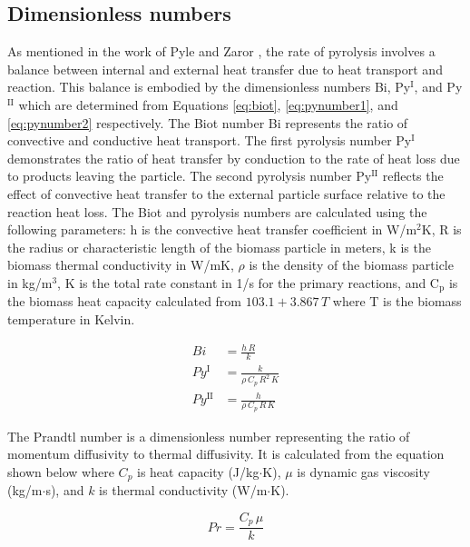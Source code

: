 
\subsection{Dimensionless numbers}

As mentioned in the work of Pyle and Zaror \cite{Pyle-1984}, the rate of pyrolysis involves a balance between internal and external heat transfer due to heat transport and reaction. This balance is embodied by the dimensionless numbers Bi, Py$^\textrm{I}$, and Py$^\textrm{II}$ which are determined from Equations \ref{eq:biot}, \ref{eq:pynumber1}, and \ref{eq:pynumber2} respectively. The Biot number Bi represents the ratio of convective and conductive heat transport. The first pyrolysis number Py$^\textrm{I}$ demonstrates the ratio of heat transfer by conduction to the rate of heat loss due to products leaving the particle. The second pyrolysis number Py$^\textrm{II}$ reflects the effect of convective heat transfer to the external particle surface relative to the reaction heat loss. The Biot and pyrolysis numbers are calculated using the following parameters: h is the convective heat transfer coefficient in W/m$^2$K, R is the radius or characteristic length of the biomass particle in meters, k is the biomass thermal conductivity in W/mK, $\rho$ is the density of the biomass particle in kg/m$^3$, K is the total rate constant in 1/s for the primary reactions, and C$_\textrm{p}$ is the biomass heat capacity calculated from $103.1 + 3.867\,T$ where T is the biomass temperature in Kelvin.

\begin{align}
    Bi &= \frac{h\,R}{k} \label{eq:biot} \\
    Py^{\textrm{I}} &= \frac{k}{\rho\,C_p\,R^2\,K} \label{eq:pynumber1} \\
    Py^{\textrm{II}} &= \frac{h}{\rho\,C_p\,R\,K} \label{eq:pynumber2}
\end{align}

The Prandtl number is a dimensionless number representing the ratio of momentum diffusivity to thermal diffusivity. It is calculated from the equation shown below where $C_p$ is heat capacity (J/kg$\cdot$K), $\mu$ is dynamic gas viscosity (kg/m$\cdot$s), and $k$ is thermal conductivity (W/m$\cdot$K).

\begin{equation}
    Pr = \frac{C_p\, \mu}{k}
\end{equation}

